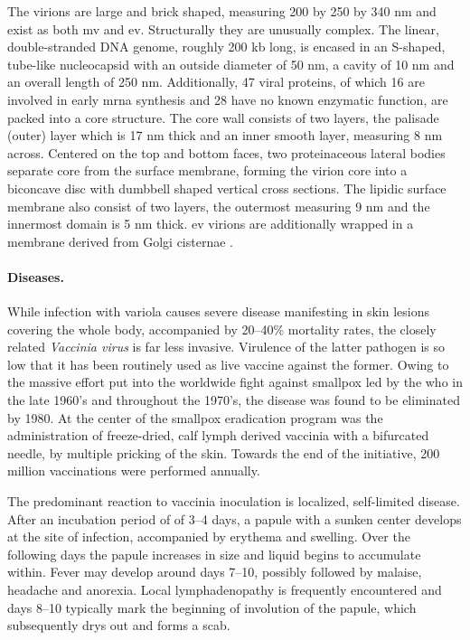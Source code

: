 The virions are large and brick shaped, measuring 200 by 250 by 340 nm and exist as both \gls{mv} and \gls{ev}. Structurally they are unusually complex. The linear, double-stranded DNA genome, roughly 200 kb long, is encased in an S-shaped, tube-like nucleocapsid with an outside diameter of 50 nm, a cavity of 10 nm and an overall length of 250 nm. Additionally, 47 viral proteins, of which 16 are involved in early \gls{mrna} synthesis and 28 have no known enzymatic function, are packed into a core structure. The core wall consists of two layers, the palisade (outer) layer which is 17 nm thick and an inner smooth layer, measuring 8 nm across. Centered on the top and bottom faces, two proteinaceous lateral bodies separate core from the surface membrane, forming the virion core into a biconcave disc with dumbbell shaped vertical cross sections. The lipidic surface membrane also consist of two layers, the outermost measuring 9 nm and the innermost domain is 5 nm thick. \Gls{ev} virions are additionally wrapped in a membrane derived from Golgi cisternae \citep{Marennikova2005,Condit2006}.

\paragraph{Diseases.}
While infection with variola causes severe disease manifesting in skin lesions covering the whole body, accompanied by 20--40\% mortality rates, the closely related \textit{Vaccinia virus} is far less invasive. Virulence of the latter pathogen is so low that it has been routinely used as live vaccine against the former. Owing to the massive effort put into the worldwide fight against smallpox led by the \gls{who} in the late 1960's and throughout the 1970's, the disease was found to be eliminated by 1980. At the center of the smallpox eradication program was the administration of freeze-dried, calf lymph derived vaccinia with a bifurcated needle, by multiple pricking of the skin. Towards the end of the initiative, 200 million vaccinations were performed annually.

The predominant reaction to vaccinia inoculation is localized, self-limited disease. After an incubation period of of 3--4 days, a papule with a sunken center develops at the site of infection, accompanied by erythema and swelling. Over the following days the papule increases in size and liquid begins to accumulate within. Fever may develop around days 7--10, possibly followed by malaise, headache and anorexia. Local lymphadenopathy is frequently encountered and days 8--10 typically mark the beginning of involution of the papule, which subsequently drys out and forms a scab.

